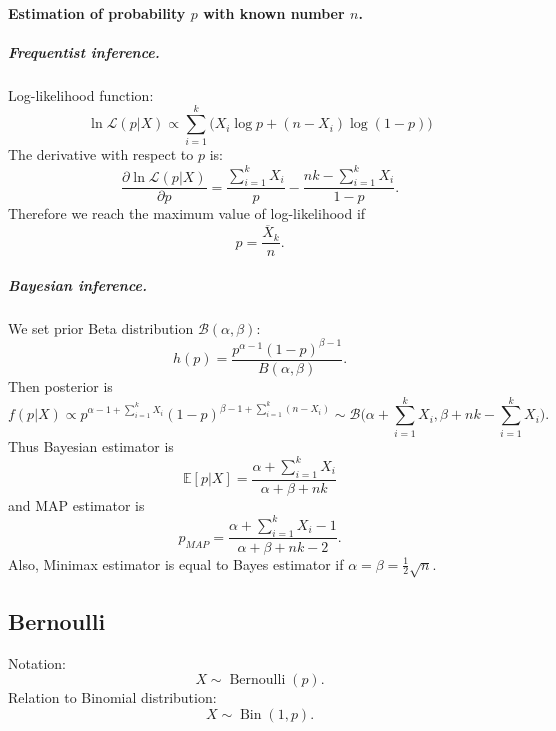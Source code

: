 \documentclass[a4paper,11pt]{article}
\theoremstyle{plain}
\theoremstyle{definition}
\begin{document}
	\paragraph{Estimation of probability $p$ with known number $n$.}
	\subparagraph{Frequentist inference.} Log-likelihood function:
	\[
	\ln \mathcal{L}(p|X) \propto \sum_{i=1}^{k} \big(X_i \log p + (n-X_i) \log(1-p)\big)
	\]
	The derivative with respect to $p$ is:
	\[
	\frac{\partial \ln \mathcal{L}(p|X)}{\partial p} = \frac{\sum_{i=1}^k X_i}{p} - \frac{nk - \sum_{i=1}^{k}X_i}{1-p}.
	\]
	Therefore we reach the maximum value of log-likelihood if
	\[
	p = \frac{\overline X_k}{n}.
	\]
	
	\subparagraph{Bayesian inference.}
	We set prior Beta distribution $\mathcal{B}(\alpha, \beta)$:
	\[
	h(p) = \frac{p^{\alpha-1} (1-p)^{\beta - 1}}{B(\alpha, \beta)}.
	\]
	Then posterior is
	\[
	f(p|X) \propto p^{\alpha-1 + \sum_{i=1}^k X_i} (1-p)^{\beta - 1 + \sum_{i=1}^k (n - X_i)} \sim \mathcal{B}\bigg(\alpha + \sum_{i=1}^k X_i, \beta + nk - \sum_{i=1}^k X_i\bigg).
	\]
	Thus Bayesian estimator is
	\[ \mathbb{E}[p|X] = \frac{\alpha + \sum_{i=1}^k X_i}{\alpha + \beta + nk} \]
	and MAP estimator is
	\[ p_{MAP} = \frac{\alpha + \sum_{i=1}^k X_i - 1}{\alpha + \beta + nk - 2}. \]
	Also, Minimax estimator is equal to Bayes estimator if $\alpha = \beta = \frac{1}{2}\sqrt{n}$.
	
	
	\subsection{Bernoulli}
	Notation:
	\[ X \sim \operatorname{Bernoulli}(p). \]
	Relation to Binomial distribution: \[X \sim \operatorname{Bin}(1, p). \]
	
	\pagebreak
\end{document}

